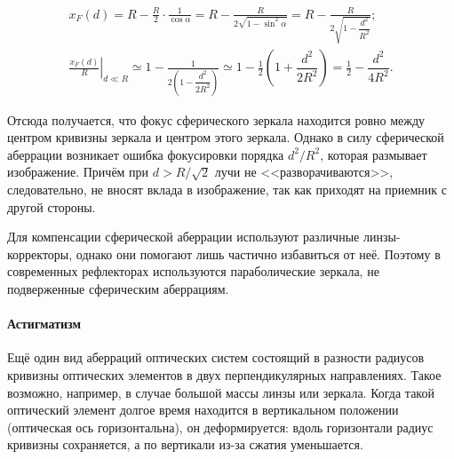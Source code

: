 \begin{gather*}
	x_F(d) = R - \frac{R}{2} \cdot \frac{1}{\cos\alpha} = R - \frac{R}{2\sqrt{1 - \sin^2 \alpha}}  = R  - \frac{R}{2\sqrt{1 - \dfrac{d^2}{R^2}}};\\
	\left. \frac{x_F(d)}{R} \right|_{d \ll R} \simeq  1  - \frac{1}{2\left(1 - \dfrac{d^2}{2R^2} \right)} \simeq  1 - \frac{1}{2}\left(1 + \dfrac{d^2}{2R^2} \right)  = \frac{1}{2} -  \dfrac{d^2}{4R^2}.
\end{gather*}
\begin{figure}
	\centering
	\vspace{-.5pc}
	\caption{}
\end{figure}
Отсюда получается, что фокус сферического зеркала находится ровно между центром кривизны зеркала и центром этого зеркала. Однако в силу сферической аберрации возникает ошибка фокусировки порядка $d^2/R^2$, которая размывает изображение. Причём при $d > R/\sqrt{2}$ лучи не <<разворачиваются>>, следовательно, не вносят вклада в изображение, так как приходят на приемник с другой стороны.

Для компенсации сферической аберрации используют различные линзы-коррек\-торы, однако они помогают лишь частично избавиться от неё. Поэтому в современных рефлекторах используются параболические зеркала, не подверженные сферическим аберрациям.


\paragraph{Астигматизм} Ещё один вид аберраций оптических систем состоящий в разности радиусов кривизны оптических элементов в двух перпендикулярных направлениях. Такое возможно, например, в случае большой массы линзы или зеркала. Когда такой оптический элемент долгое время находится в вертикальном положении (оптическая ось горизонтальна), он деформируется: вдоль горизонтали радиус кривизны сохраняется, а по вертикали из-за сжатия уменьшается.

